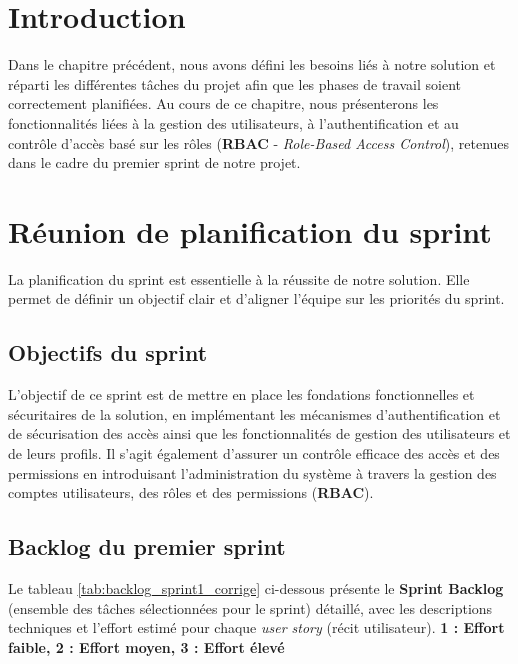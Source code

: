 ﻿%

\section*{Introduction}
Dans le chapitre précédent, nous avons défini les besoins liés à notre solution et réparti les différentes tâches du projet afin que les phases de travail soient correctement planifiées.
\newline Au cours de ce chapitre, nous présenterons les fonctionnalités liées  à la gestion des utilisateurs, à l'authentification et au contrôle d'accès basé sur les rôles (\textbf{RBAC} - \textit{Role-Based Access Control}), retenues dans le cadre du premier sprint de notre projet.
\section{Réunion de planification du sprint}
\label{sec:planning_sprint1}
La planification du sprint est essentielle à la réussite de notre solution. Elle permet de définir un objectif clair et d'aligner l'équipe sur les priorités du sprint.

\subsection{Objectifs du sprint}
L'objectif de ce sprint est de mettre en place les fondations fonctionnelles et
sécuritaires de la solution, en implémentant les mécanismes d'authentification et
de sécurisation des accès ainsi que les fonctionnalités de gestion des utilisateurs
et de leurs profils. Il s'agit également d'assurer un contrôle efficace des accès
et des permissions en introduisant l'administration du système à travers la gestion
des comptes utilisateurs, des rôles et des permissions (\textbf{RBAC}).

\subsection{Backlog du premier sprint}
\label{sec:backlog_sprint1}
Le tableau \ref{tab:backlog_sprint1_corrige} ci-dessous présente le \textbf{Sprint Backlog} (ensemble des tâches sélectionnées pour le sprint) détaillé, avec les descriptions techniques et l'effort estimé pour chaque \textit{user story} (récit utilisateur).
\newline
\textbf{1 : Effort faible, 2 : Effort moyen, 3 : Effort élevé}


